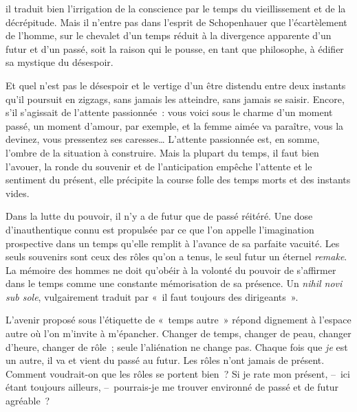 \documentclass[french,twoside]{book} %
\newcommand{\astermono}{\medskip\centerline{\color{rubric}\large\selectfont{\syms ✻}}\medskip\par}%
\begin{document}
\noindent  il traduit bien l’irrigation de la conscience par le temps du vieillissement et de la décrépitude. Mais il n’entre pas dans l’esprit de Schopenhauer que l’écartèlement de l’homme, sur le chevalet d’un temps réduit à la divergence apparente d’un futur et d’un passé, soit la raison qui le pousse, en tant que philosophe, à édifier sa mystique du désespoir.\par
Et quel n’est pas le désespoir et le vertige d’un être distendu entre deux instants qu’il poursuit en zigzags, sans jamais les atteindre, sans jamais se saisir. Encore, s’il s’agissait de l’attente passionnée : vous voici sous le charme d’un moment passé, un moment d’amour, par exemple, et la femme aimée va paraître, vous la devinez, vous pressentez ses caresses… L’attente passionnée est, en somme, l’ombre de la situation à construire. Mais la plupart du temps, il faut bien l’avouer, la ronde du souvenir et de l’anticipation empêche l’attente et le sentiment du présent, elle précipite la course folle des temps morts et des instants vides.\par
Dans la lutte du pouvoir, il n’y a de futur que de passé réitéré. Une dose d’inauthentique connu est propulsée par ce que l’on appelle l’imagination prospective dans un temps qu’elle remplit à l’avance de sa parfaite vacuité. Les seuls souvenirs sont ceux des rôles qu’on a tenus, le seul futur un éternel \emph{remake}. La mémoire des hommes ne doit qu’obéir à la volonté du pouvoir de s’affirmer dans le temps comme une constante mémorisation de sa présence. Un \emph{nihil novi sub sole}, vulgairement traduit par « il faut toujours des dirigeants ».\par
L’avenir proposé sous l’étiquette de « temps autre » répond dignement à l’espace autre où l’on m’invite à m’épancher. Changer de temps, changer de peau, changer d’heure, changer de rôle ; seule l’aliénation ne change pas. Chaque fois que \emph{je} est un autre, il va et vient du passé au futur. Les rôles n’ont jamais de présent. Comment voudrait-on que les rôles se portent bien ? Si je rate mon présent, – ici étant toujours ailleurs, – pourrais-je me trouver environné de passé et de futur agréable ?\par

\astermono
\end{document}
